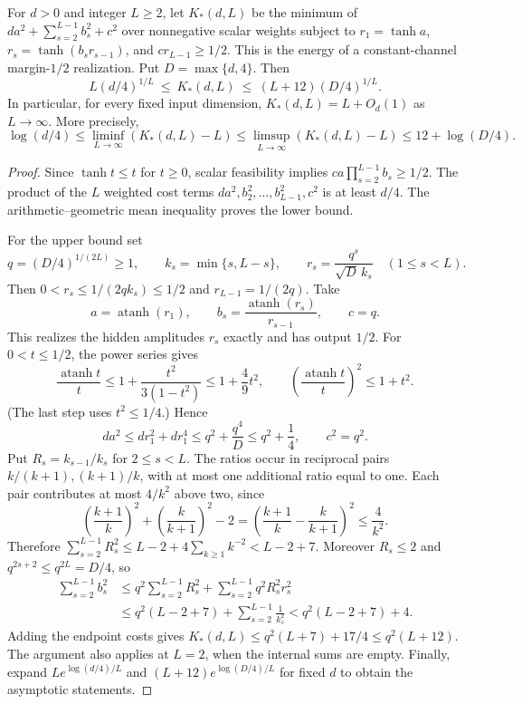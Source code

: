 \begin{proposition}
For $d>0$ and integer $L\ge2$, let $K_*(d,L)$ be the minimum of
$da^2+\sum_{s=2}^{L-1}b_s^2+c^2$ over nonnegative scalar weights
subject to
$r_1=\tanh a$, $r_s=\tanh(b_sr_{s-1})$, and $cr_{L-1}\ge1/2$.
This is the energy of a constant-channel margin-$1/2$ realization.
Put $D=\max\{d,4\}$. Then
\[
 L(d/4)^{1/L}\ \le\ K_*(d,L)\ \le\ (L+12)(D/4)^{1/L}.
\]
In particular, for every fixed input dimension, $K_*(d,L)=L+O_d(1)$ as
$L\to\infty$. More precisely,
\[
 \log(d/4)\le\liminf_{L\to\infty}(K_*(d,L)-L)
 \le\limsup_{L\to\infty}(K_*(d,L)-L)
 \le12+\log(D/4).
\]
\end{proposition}

\begin{proof}
Since $\tanh t\le t$ for $t\ge0$, scalar feasibility implies
$ca\prod_{s=2}^{L-1}b_s\ge1/2$. The product of the $L$ weighted cost terms
$da^2,b_2^2,\ldots,b_{L-1}^2,c^2$ is at least $d/4$.
The arithmetic--geometric mean inequality proves the lower bound.

For the upper bound set
\[
 q=(D/4)^{1/(2L)}\ge1,\qquad
 k_s=\min\{s,L-s\},\qquad
 r_s=\frac{q^s}{\sqrt D\,k_s}\quad(1\le s<L).
\]
Then $0<r_s\le1/(2qk_s)\le1/2$ and $r_{L-1}=1/(2q)$.
Take
\[
 a=\operatorname{atanh}(r_1),\qquad
 b_s=\frac{\operatorname{atanh}(r_s)}{r_{s-1}},\qquad c=q.
\]
This realizes the hidden amplitudes $r_s$ exactly and has output $1/2$.
For $0<t\le1/2$, the power series gives
\[
 \frac{\operatorname{atanh}t}{t}
 \le1+\frac{t^2}{3(1-t^2)}\le1+\frac49t^2,
 \qquad
 \left(\frac{\operatorname{atanh}t}{t}\right)^2\le1+t^2.
\]
(The last step uses $t^2\le1/4$.) Hence
\[
 da^2\le dr_1^2+dr_1^4\le q^2+\frac{q^4}{D}\le q^2+\frac14,
 \qquad c^2=q^2.
\]
Put $R_s=k_{s-1}/k_s$ for $2\le s<L$.
The ratios occur in reciprocal pairs $k/(k+1),(k+1)/k$, with at most one
additional ratio equal to one. Each pair contributes at most $4/k^2$ above
two, since
\[
 \left(\frac{k+1}k\right)^2+
 \left(\frac{k}{k+1}\right)^2-2
 =\left(\frac{k+1}k-\frac{k}{k+1}\right)^2\le\frac4{k^2}.
\]
Therefore $\sum_{s=2}^{L-1}R_s^2\le L-2+4\sum_{k\ge1}k^{-2}<L-2+7$.
Moreover $R_s\le2$ and $q^{2s+2}\le q^{2L}=D/4$, so
\[
 \begin{split}
 \sum_{s=2}^{L-1}b_s^2
 &\le q^2\sum_{s=2}^{L-1}R_s^2
       +\sum_{s=2}^{L-1}q^2R_s^2r_s^2\\
 &\le q^2(L-2+7)+\sum_{s=2}^{L-1}\frac1{k_s^2}
 <q^2(L-2+7)+4.
 \end{split}
\]
Adding the endpoint costs gives
$K_*(d,L)\le q^2(L+7)+17/4\le q^2(L+12)$.
The argument also applies at $L=2$, when the internal sums are empty.
Finally, expand $L e^{\log(d/4)/L}$ and
$(L+12)e^{\log(D/4)/L}$ for fixed $d$ to obtain the asymptotic statements.
\end{proof}
